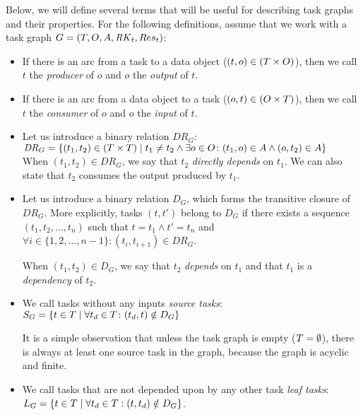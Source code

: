 \vspace{2mm}Below, we will define several terms that will be useful for describing task
graphs and their properties. For the following definitions, assume that we work with a
task graph $G = (T, O, A, \mathit{RK}_t, Res_t)$:
\begin{itemize}[itemsep=0pt]
	\item If there is an arc from a task to a data object ($(t,o) \in (T\times{}O)$),
		  then we call
	      $t$ the \emph{producer} of $o$ and
	      $o$ the \emph{output} of $t$.
	\item If there is an arc from a data object to a task ($(o,t) \in (O\times{}T)$), then we
		  call $t$ the \emph{consumer} of $o$ and $o$ the \emph{input} of $t$.

	\item Let us introduce a binary relation $\mathit{DR}_G$: \\
	$\mathit{DR}_G = \{(t_1, t_2)\in{}(T\times{}T) \mid t_1 \neq t_2 \land
		      \exists{}o\in{}O\colon (t_1, o)\in{}A
		      \land (o, t_2)\in{}A\}$ \\ When
	      $(t_1, t_2) \in \mathit{DR}_G$, we say that $t_2$ \emph{directly depends} on
	      $t_1$. We can also state that $t_2$ consumes the output produced
	      by $t_1$.

	\item Let us introduce a binary relation $D_G$, which forms the transitive closure of
	      $\mathit{DR}_G$. More explicitly, tasks $(t, t')$ belong to $D_G$ if there
	      exists a sequence $(t_1, t_2, \ldots, t_n)$ such that $t = t_1 \land t' = t_n$ and
		  $\forall i \in \{1,2,\ldots,n - 1\}: (t_i, t_{i+1}) \in DR_G$.

	      When $(t_1, t_2) \in D_G$, we say that $t_2$ \emph{depends} on
	      $t_1$ and that $t_1$ is a \emph{dependency} of
	      $t_2$.

	\item We call tasks without any inputs \emph{source tasks}: \vspace{1mm}\\ $S_G = \{ t\in{}T \mid
		      \forall{}t_d\in{}T\colon (t_d, t)\notin D_G\}$

		  It is a simple observation that unless the task graph is empty ($T = \emptyset$), there is always at least one source task in the graph, because the graph is acyclic and finite.
	\item We call tasks that are not depended upon by any other task \emph{leaf tasks}: \vspace{1mm}\\
	      $L_G = \{ t\in{}T \mid \forall{}t_d\in{}T: (t, t_d)\notin D_G\}$.
\end{itemize}

